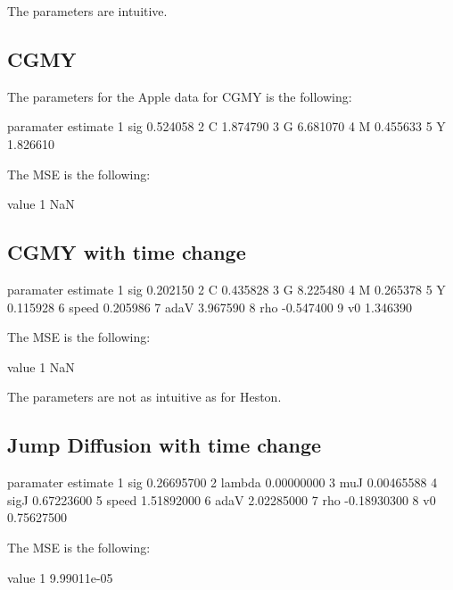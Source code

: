 \documentclass{article}
\begin{document}
The parameters are intuitive.

\subsection{CGMY}

The parameters for the Apple data for CGMY is the following:

\begin{Schunk}
\begin{Soutput}
  paramater estimate
1       sig 0.524058
2         C 1.874790
3         G 6.681070
4         M 0.455633
5         Y 1.826610
\end{Soutput}
\end{Schunk}

The MSE is the following:

\begin{Schunk}
\begin{Soutput}
  value
1   NaN
\end{Soutput}
\end{Schunk}

\subsection{CGMY with time change}

\begin{Schunk}
\begin{Soutput}
  paramater  estimate
1       sig  0.202150
2         C  0.435828
3         G  8.225480
4         M  0.265378
5         Y  0.115928
6     speed  0.205986
7      adaV  3.967590
8       rho -0.547400
9        v0  1.346390
\end{Soutput}
\end{Schunk}
The MSE is the following:

\begin{Schunk}
\begin{Soutput}
  value
1   NaN
\end{Soutput}
\end{Schunk}

The parameters are not as intuitive as for Heston.

\subsection{Jump Diffusion with time change}
\begin{Schunk}
\begin{Soutput}
  paramater    estimate
1       sig  0.26695700
2    lambda  0.00000000
3       muJ  0.00465588
4      sigJ  0.67223600
5     speed  1.51892000
6      adaV  2.02285000
7       rho -0.18930300
8        v0  0.75627500
\end{Soutput}
\end{Schunk}
The MSE is the following:

\begin{Schunk}
\begin{Soutput}
        value
1 9.99011e-05
\end{Soutput}
\end{Schunk}
\end{document}
